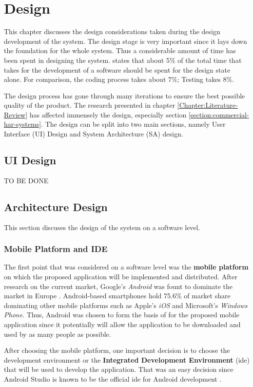 \chapter{Design}
\label{Chapter:Design}

This chapter discusses the design considerations taken during the design development of the system. The design stage is very important since it lays down the foundation for the whole system.
Thus a considerable amount of time has been spent in designing the system. \citet[12]{bell2005} states that about 5\% of the total time that takes for the development of a software should be spent for the design state alone. For comparison, the coding process takes about 7\%; Testing takes 8\%. 

The design process has gone through many iterations to ensure the best possible quality of the product. The research presented in chapter \ref{Chapter:Literature-Review} has affected immensely the design, especially section \ref{section:commercial-har-systems}. The design can be split into two main sections, namely User Interface (UI) Design and System Architecture (SA) design.

    \section{UI Design}
    TO BE DONE
    
    \section{Architecture Design}
    This section discuses the design of the system on a software level.
    
        \subsection{Mobile Platform and IDE}
        The first point that was considered on a software level was the \textbf{mobile platform} on which the proposed application will be implemented and distributed. After research on the current market, Google's \textit{Android} was fount to dominate the market in Europe \citep{williams2016}. Android-based smartphones hold 75.6\% of market share dominating other mobile platforms such as Apple's \textit{iOS} and Microsoft's \textit{Windows Phone}. Thus, Android was chosen to form the basis of for the proposed mobile application since it potentially will allow the application to be downloaded and used by as many people as possible.
        
        After choosing the mobile platform, one important decision is to choose the development environment or the \textbf{Integrated Development Environment} (\gls{ide}) that will be used to develop the application. That was an easy decision since Android Studio is known to be the official \gls{ide} for Android development \citep{androidstudio2017}.